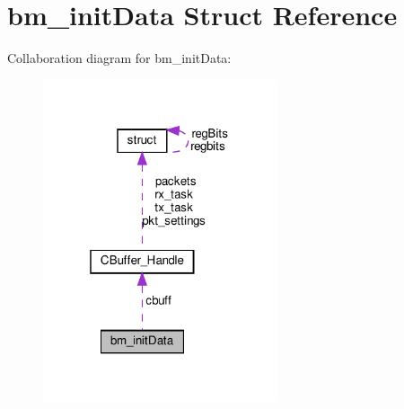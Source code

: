 \hypertarget{structbm__initData}{}\section{bm\+\_\+init\+Data Struct Reference}
\label{structbm__initData}


Collaboration diagram for bm\+\_\+init\+Data\+:\nopagebreak
\begin{figure}[H]
\begin{center}
\leavevmode
\includegraphics[width=196pt]{structbm__initData__coll__graph}
\end{center}
\end{figure}
